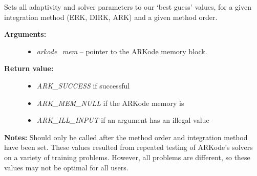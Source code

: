 \documentclass[letterpaper,10pt,english]{sphinxmanual}
\begin{document}
\begin{fulllineitems}
\label{c_interface/User_callable:ARKodeSetOptimalParams}
Sets all adaptivity and solver parameters to our `best
guess' values, for a given integration method (ERK, DIRK, ARK) and
a given method order.
\begin{description}
\item[{\textbf{Arguments:}}] \leavevmode\begin{itemize}
\item {} 
\emph{arkode\_mem} -- pointer to the ARKode memory block.

\end{itemize}

\item[{\textbf{Return value:}}] \leavevmode\begin{itemize}
\item {} 
\emph{ARK\_SUCCESS} if successful

\item {} 
\emph{ARK\_MEM\_NULL} if the ARKode memory is 

\item {} 
\emph{ARK\_ILL\_INPUT} if an argument has an illegal value

\end{itemize}

\end{description}

\textbf{Notes:} Should only be called after the method order and integration
method have been set.  These values resulted from repeated testing
of ARKode's solvers on a variety of training problems.  However,
all problems are different, so these values may not be optimal for
all users.

\end{fulllineitems}

\end{document}

